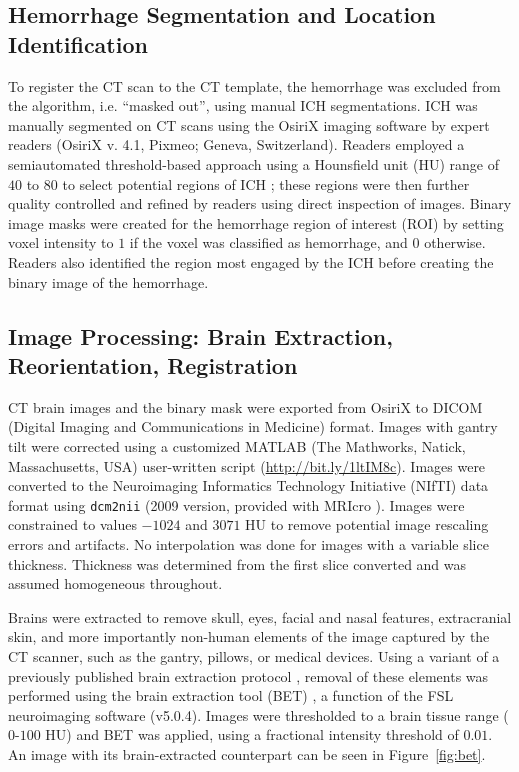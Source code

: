 \documentclass[10pt]{article}\usepackage[]{graphicx}\usepackage[]{color}
\begin{document}
\subsection{Hemorrhage Segmentation and Location Identification}
To register the CT scan to the CT template, the hemorrhage was excluded from the algorithm, i.e. ``masked out'', using manual ICH segmentations.  ICH was manually segmented on CT scans using the OsiriX imaging software by expert readers (OsiriX v. 4.1, Pixmeo; Geneva, Switzerland).  Readers employed a semiautomated threshold-based approach using a Hounsfield unit (HU) range of $40$ to $80$ to select potential regions of ICH \citep{bergstrom_variation_1977, smith_imaging_2006}; these regions were then further quality controlled and refined by readers using direct inspection of images.  Binary image masks were created for the hemorrhage region of interest (ROI) by setting voxel intensity to $1$ if the voxel was classified as hemorrhage, and $0$ otherwise.  Readers also identified the region most engaged by the ICH before creating the binary image of the hemorrhage.

\subsection{Image Processing: Brain Extraction, Reorientation, Registration}
CT brain images and the binary mask were exported from OsiriX to DICOM (Digital Imaging and Communications in Medicine) format.  Images with gantry tilt were corrected using a customized MATLAB (The Mathworks, Natick, Massachusetts, USA) user-written script ({\scriptsize \url{http://bit.ly/1ltIM8c}}). 
Images were converted to the Neuroimaging Informatics Technology Initiative (NIfTI) data format using \verb|dcm2nii| (2009 version, provided with MRIcro \citep{rorden_stereotaxic_2000}).  Images were constrained to values $-1024$ and $3071$ HU to remove potential image rescaling errors and artifacts.  No interpolation was done for images with a variable slice thickness. Thickness was determined from the first slice converted and was assumed homogeneous throughout.  

Brains were extracted to remove skull, eyes, facial and nasal features, extracranial skin, and more importantly non-human elements of the image captured by the CT scanner, such as the gantry, pillows, or medical devices.  Using a variant of a previously published brain extraction protocol \citep{rorden_age-specific_2012}, removal of these elements was performed using the brain extraction tool (BET) \citep{smith_fast_2002}, a function of the FSL \citep{jenkinson_fsl_2012} neuroimaging software (v5.0.4).  Images were thresholded to a brain tissue range ($0$-$100$ HU) and BET was applied, using a fractional intensity threshold of $0.01$.  An image with its brain-extracted counterpart can be seen in Figure~\ref{fig:bet}.  
\end{document}
